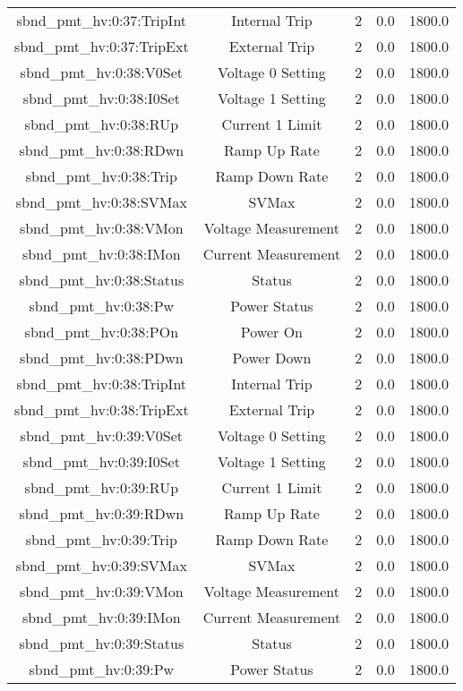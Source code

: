 \begin{center}
\begin{longtable}{c | c c c c }
sbnd\_pmt\_hv:0:37:TripInt & Internal Trip & 2 & 0.0 & 1800.0\\ 
sbnd\_pmt\_hv:0:37:TripExt & External Trip & 2 & 0.0 & 1800.0\\ 
sbnd\_pmt\_hv:0:38:V0Set & Voltage 0 Setting & 2 & 0.0 & 1800.0\\ 
sbnd\_pmt\_hv:0:38:I0Set & Voltage 1 Setting & 2 & 0.0 & 1800.0\\ 
sbnd\_pmt\_hv:0:38:RUp & Current 1 Limit & 2 & 0.0 & 1800.0\\ 
sbnd\_pmt\_hv:0:38:RDwn & Ramp Up Rate & 2 & 0.0 & 1800.0\\ 
sbnd\_pmt\_hv:0:38:Trip & Ramp Down Rate & 2 & 0.0 & 1800.0\\ 
sbnd\_pmt\_hv:0:38:SVMax & SVMax & 2 & 0.0 & 1800.0\\ 
sbnd\_pmt\_hv:0:38:VMon & Voltage Measurement & 2 & 0.0 & 1800.0\\ 
sbnd\_pmt\_hv:0:38:IMon & Current Measurement & 2 & 0.0 & 1800.0\\ 
sbnd\_pmt\_hv:0:38:Status & Status & 2 & 0.0 & 1800.0\\ 
sbnd\_pmt\_hv:0:38:Pw & Power Status & 2 & 0.0 & 1800.0\\ 
sbnd\_pmt\_hv:0:38:POn & Power On & 2 & 0.0 & 1800.0\\ 
sbnd\_pmt\_hv:0:38:PDwn & Power Down & 2 & 0.0 & 1800.0\\ 
sbnd\_pmt\_hv:0:38:TripInt & Internal Trip & 2 & 0.0 & 1800.0\\ 
sbnd\_pmt\_hv:0:38:TripExt & External Trip & 2 & 0.0 & 1800.0\\ 
sbnd\_pmt\_hv:0:39:V0Set & Voltage 0 Setting & 2 & 0.0 & 1800.0\\ 
sbnd\_pmt\_hv:0:39:I0Set & Voltage 1 Setting & 2 & 0.0 & 1800.0\\ 
sbnd\_pmt\_hv:0:39:RUp & Current 1 Limit & 2 & 0.0 & 1800.0\\ 
sbnd\_pmt\_hv:0:39:RDwn & Ramp Up Rate & 2 & 0.0 & 1800.0\\ 
sbnd\_pmt\_hv:0:39:Trip & Ramp Down Rate & 2 & 0.0 & 1800.0\\ 
sbnd\_pmt\_hv:0:39:SVMax & SVMax & 2 & 0.0 & 1800.0\\ 
sbnd\_pmt\_hv:0:39:VMon & Voltage Measurement & 2 & 0.0 & 1800.0\\ 
sbnd\_pmt\_hv:0:39:IMon & Current Measurement & 2 & 0.0 & 1800.0\\ 
sbnd\_pmt\_hv:0:39:Status & Status & 2 & 0.0 & 1800.0\\ 
sbnd\_pmt\_hv:0:39:Pw & Power Status & 2 & 0.0 & 1800.0\\ 

\end{longtable}
\end{center}
